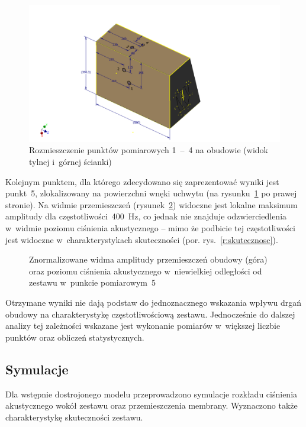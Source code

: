 \documentclass[12pt]{oska}
\newcommand{\range}[2]{\num{#1}~--~\num{#2}}
\begin{document}
		\begin{figure}[!ht]
			\centering
			\includegraphics[width=.8\textwidth,trim={5cm .3cm 5cm 2.7cm},clip]{wibrometr.pdf}
			\caption{Rozmieszczenie punktów pomiarowych \range{1}{4} na obudowie (widok tylnej i~górnej ścianki)}
			\label{r:wibro_pkt}
		\end{figure}
		
		Kolejnym punktem, dla którego zdecydowano się zaprezentować wyniki jest punkt~\num{5}, zlokalizowany na powierzchni wnęki uchwytu (na rysunku~\ref{r:wibro_pkt} po prawej stronie). Na widmie przemieszczeń (rysunek~\ref{r:wibrometr_5}) widoczne jest lokalne maksimum amplitudy dla częstotliwości~\SI{400}{\hertz}, co jednak nie znajduje odzwierciedlenia w~widmie poziomu ciśnienia akustycznego -- mimo że podbicie tej częstotliwości jest widoczne w~charakterystykach skuteczności (por. rys.~\ref{r:skutecznosc}).%
		
		\begin{figure}[!ht]
			\centering
			\caption{Znormalizowane widma amplitudy przemieszczeń obudowy (góra) oraz poziomu ciśnienia akustycznego w~niewielkiej odległości od zestawu w~punkcie pomiarowym~\num{5}}
			\label{r:wibrometr_5}
		\end{figure}
		
		Otrzymane wyniki nie dają podstaw do jednoznacznego wskazania wpływu drgań obudowy na charakterystykę częstotliwościową zestawu. Jednocześnie do dalszej analizy tej zależności wskazane jest wykonanie pomiarów w~większej liczbie punktów oraz obliczeń statystycznych.
		
	\subsection{Symulacje}
		
		Dla wstępnie dostrojonego modelu przeprowadzono symulacje rozkładu ciśnienia akustycznego wokół zestawu oraz przemieszczenia membrany. Wyznaczono także charakterystykę skuteczności zestawu. 
		
\end{document}
